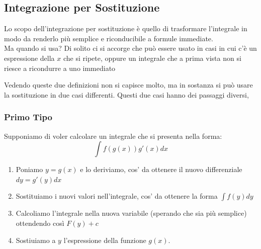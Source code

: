 \documentclass[12pt, a4paper, openany]{book}
\begin{document}

	\subsection{Integrazione per Sostituzione}
	Lo scopo dell'integrazione per sostituzione è quello di trasformare l'integrale in modo da renderlo più semplice
	e riconducibile a formule immediate.
	\\ Ma quando si usa? Di solito ci si accorge che può essere usato in casi in cui c'è un espressione della $x$ che si ripete,
	oppure un integrale che a prima vista non si riesce a ricondurre a uno immediato


	Vedendo queste due definizioni non si capisce molto,
	ma in sostanza si può usare la sostituzione in due casi differenti.
	Questi due casi hanno dei passaggi diversi,
	\subsubsection*{Primo Tipo}
	Supponiamo di voler calcolare un integrale che si presenta nella forma:
	$$\int f(g(x)) g'(x) dx$$
	\begin{enumerate}
		\item Poniamo $y=g(x)$ e lo deriviamo, cos' da ottenere il nuovo differenziale $dy = g'(y)dx$
		\item Sostituiamo i nuovi valori nell'integrale, cos' da ottenere la forma $\int f(y) dy$
		\item Calcoliamo l'integrale nella nuova variabile (sperando che sia più semplice) ottendendo così $F(y) + c$
		\item Sostiuiamo a $y$ l'espressione della funzione $g(x)$.
	\end{enumerate}
\end{document}
